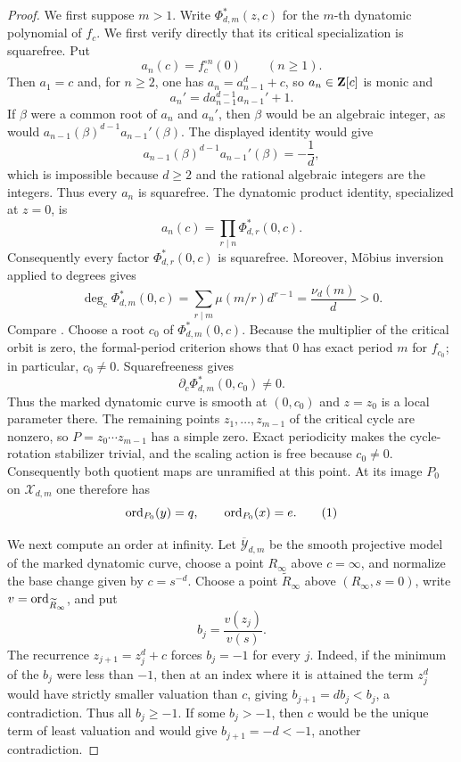 \begin{proof}
We first suppose $m>1$.  Write $\Phi^*_{d,m}(z,c)$ for the $m$-th
dynatomic polynomial of $f_c$.  We first verify directly that its
critical specialization is squarefree.  Put
\[
 a_n(c)=f_c^{\circ n}(0)\qquad(n\geq1).
\]
Then $a_1=c$ and, for $n\geq2$, one has $a_n=a_{n-1}^d+c$, so
$a_n\in\mathbf Z[c]$ is monic and
\[
 a_n'=d a_{n-1}^{d-1}a_{n-1}'+1.
\]
If $\beta$ were a common root of $a_n$ and $a_n'$, then $\beta$ would be
an algebraic integer, as would
$a_{n-1}(\beta)^{d-1}a_{n-1}'(\beta)$.  The displayed identity would give
\[
 a_{n-1}(\beta)^{d-1}a_{n-1}'(\beta)=-\frac1d,
\]
which is impossible because $d\geq2$ and the rational algebraic
integers are the integers.  Thus every $a_n$ is squarefree.  The
dynatomic product identity, specialized at $z=0$, is
\[
 a_n(c)=\prod_{r\mid n}\Phi^*_{d,r}(0,c).
\]
Consequently every factor $\Phi^*_{d,r}(0,c)$ is squarefree.  Moreover,
M\"obius inversion applied to degrees gives
\[
 \deg_c\Phi^*_{d,m}(0,c)
 =\sum_{r\mid m}\mu(m/r)d^{r-1}
 =\frac{\nu_d(m)}d>0.
\]
Compare \cite[Proposition 1.58]{Huguin2021Thesis}.  Choose a root $c_0$
of $\Phi^*_{d,m}(0,c)$.  Because the
multiplier of the critical orbit is zero, the formal-period criterion
shows that $0$ has exact period $m$ for $f_{c_0}$; in particular,
$c_0\ne0$.  Squarefreeness gives
\[
 \partial_c\Phi^*_{d,m}(0,c_0)\ne0.
\]
Thus the marked dynatomic curve is smooth at $(0,c_0)$ and $z=z_0$ is
a local parameter there.  The remaining points $z_1,\ldots,z_{m-1}$
of the critical cycle are nonzero, so $P=z_0\cdots z_{m-1}$ has a
simple zero.  Exact periodicity makes the cycle-rotation stabilizer
trivial, and the scaling action is free because $c_0\ne0$.
Consequently both quotient maps are unramified at this point.  At its
image $P_0$ on $\mathcal X_{d,m}$ one therefore has
\[
 \ord_{P_0}(y)=q,\qquad \ord_{P_0}(x)=e.
 \numberthis\label{eq:center-orders}
\]

We next compute an order at infinity.  Let
$\overline{\mathcal Y}_{d,m}$ be the smooth projective model of the
marked dynatomic curve, choose a point $R_\infty$ above $c=\infty$, and
normalize the base change given by $c=s^{-d}$.  Choose a point
$\widetilde R_\infty$ above $(R_\infty,s=0)$, write
$v=\operatorname{ord}_{\widetilde R_\infty}$, and put
\[
 b_j=\frac{v(z_j)}{v(s)}.
\]
The recurrence $z_{j+1}=z_j^d+c$ forces $b_j=-1$ for every $j$.
Indeed, if the minimum of the $b_j$ were less than $-1$, then at an
index where it is attained the term $z_j^d$ would have strictly smaller
valuation than $c$, giving $b_{j+1}=db_j<b_j$, a contradiction.  Thus
all $b_j\ge-1$.  If some $b_j>-1$, then $c$ would be the unique term of
least valuation and would give $b_{j+1}=-d<-1$, another contradiction.


\end{proof}
